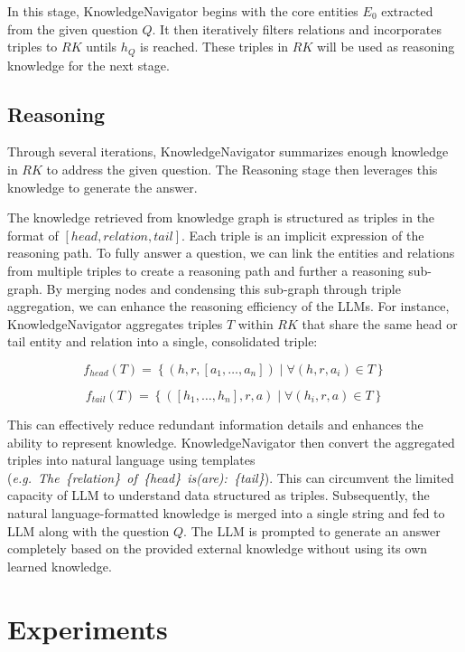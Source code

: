 \documentclass{article}
\begin{document}
In this stage, KnowledgeNavigator begins with the core entities $E_0$ extracted from the given question $Q$. It then iteratively filters relations and incorporates triples to $RK$ untils $h_Q$ is reached. These triples in $RK$ will be used as reasoning knowledge for the next stage.


\subsection{Reasoning}


Through several iterations, KnowledgeNavigator summarizes enough knowledge in $RK$ to address the given question. The Reasoning stage then leverages this knowledge to generate the answer.

The knowledge retrieved from knowledge graph is structured as triples in the format of $[head, relation, tail]$. Each triple is an implicit expression of the reasoning path. To fully answer a question, we can link the entities and relations from multiple triples to create a reasoning path and further a reasoning sub-graph. By merging nodes and condensing this sub-graph through triple aggregation, we can enhance the reasoning efficiency of the LLMs. For instance, KnowledgeNavigator aggregates triples $T$ within $RK$ that share the same head or tail entity and relation into a single, consolidated triple:

\begin{equation}
    f_{head}(T) = \left\{ (h, r, [a_1, \ldots, a_n]) \mid \forall (h, r, a_i) \in T \right\}
\end{equation}

\begin{equation}
    f_{tail}(T) = \left\{ ([h_1, \ldots, h_n], r, a) \mid \forall (h_i, r, a) \in T \right\}
\end{equation}

This can effectively reduce redundant information details and enhances the ability to represent knowledge. KnowledgeNavigator then convert the aggregated triples into natural language using templates (\textit{e.g.~The~\{relation\}~of~\{head\}~is(are):~\{tail\}}). This can circumvent the limited capacity of LLM to understand data structured as triples. Subsequently, the natural language-formatted knowledge is merged into a single string and fed to LLM along with the question $Q$. The LLM is prompted to generate an answer completely based on the provided external knowledge without using its own learned knowledge.

\section{Experiments}
\end{document}
